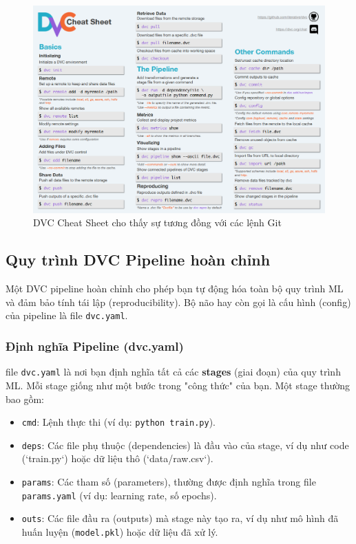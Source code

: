 \documentclass[11pt]{article}
\begin{document}
\begin{figure}[H]
    \centering
    \includegraphics[width=1\linewidth]{images/dvc_commands.png}
    \caption{DVC Cheat Sheet cho thấy sự tương đồng với các lệnh Git}
\end{figure}

\subsection{Quy trình DVC Pipeline hoàn chỉnh}
Một DVC pipeline hoàn chỉnh cho phép bạn tự động hóa toàn bộ quy trình ML và đảm bảo tính tái lập (reproducibility). Bộ não hay còn gọi là cấu hình (config) của pipeline là file \texttt{dvc.yaml}.

\subsubsection{Định nghĩa Pipeline (dvc.yaml)}
file \texttt{dvc.yaml} là nơi bạn định nghĩa tất cả các \textbf{stages} (giai đoạn) của quy trình ML. Mỗi stage giống như một bước trong "công thức" của bạn. Một stage thường bao gồm:
\begin{itemize}
    \item \texttt{cmd}: Lệnh thực thi (ví dụ: \texttt{python train.py}).
    \item \texttt{deps}: Các file phụ thuộc (dependencies) là đầu vào của stage, ví dụ như code (`train.py`) hoặc dữ liệu thô (`data/raw.csv`).
    \item \texttt{params}: Các tham số (parameters), thường được định nghĩa trong file \texttt{params.yaml} (ví dụ: learning rate, số epochs).
    \item \texttt{outs}: Các file đầu ra (outputs) mà stage này tạo ra, ví dụ như mô hình đã huấn luyện (\texttt{model.pkl}) hoặc dữ liệu đã xử lý.
\end{itemize}
\end{document}
